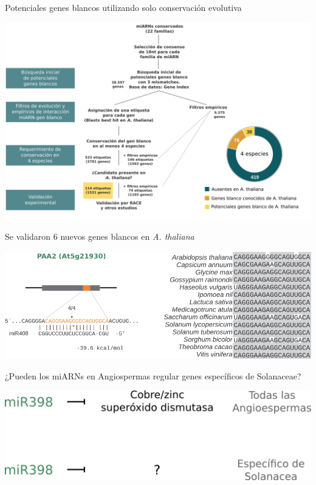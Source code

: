 \documentclass{beamer}
\begin{document}
\begin{frame}{Potenciales genes blancos utilizando solo conservación evolutiva}
	\begin{center}
		\includegraphics[width=.9\textwidth]{img/NAR_fig01y03.png}
	\end{center}
\end{frame}

\begin{frame}{Se validaron 6 nuevos genes blancos en \textit{A. thaliana}}
	\begin{center}
		\includegraphics[width=1\textwidth]{img/Figure4_retocada_nueva01.png}
	\end{center}
\end{frame}



\begin{frame}{¿Pueden los miARNs en Angiospermas regular genes específicos de Solanaceae?}
	\begin{center}
		\includegraphics[width=.8\textwidth]{img/miR398_solanaceae.png}
	\end{center}
\end{frame}
\end{document}

